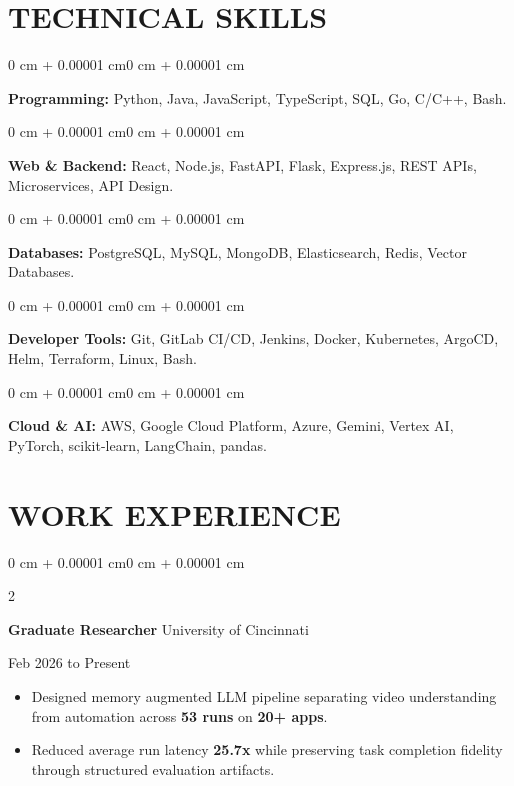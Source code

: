 \documentclass[10pt, letterpaper]{article}
\newenvironment{highlights}{
    \begin{itemize}[
        topsep=0.10 cm,
        parsep=0.06 cm,
        partopsep=0pt,
        itemsep=0.06 cm,
        leftmargin=12pt
    ]
}{
    \end{itemize}
}
\newenvironment{onecolentry}{
    \begin{adjustwidth}{0 cm + 0.00001 cm}{0 cm + 0.00001 cm}
}{
    \end{adjustwidth}
}
\newenvironment{twocolentry}[2][]{
    \onecolentry
    \def\secondColumn{#2}
    \setcolumnwidth{\fill, 4.5 cm}
    \begin{paracol}{2}
}{
    \switchcolumn \raggedleft \secondColumn
    \end{paracol}
    \endonecolentry
}
\begin{document}
\section{TECHNICAL SKILLS}
\begin{onecolentry}
\textbf{Programming:} Python, Java, JavaScript, TypeScript, SQL, Go, C/C++, Bash.
\end{onecolentry}
\vspace{0.06 cm}
\begin{onecolentry}
\textbf{Web \& Backend:} React, Node.js, FastAPI, Flask, Express.js, REST APIs, Microservices, API Design.
\end{onecolentry}
\vspace{0.06 cm}
\begin{onecolentry}
\textbf{Databases:} PostgreSQL, MySQL, MongoDB, Elasticsearch, Redis, Vector Databases.
\end{onecolentry}
\vspace{0.06 cm}
\begin{onecolentry}
\textbf{Developer Tools:} Git, GitLab CI/CD, Jenkins, Docker, Kubernetes, ArgoCD, Helm, Terraform, Linux, Bash.
\end{onecolentry}
\vspace{0.06 cm}
\begin{onecolentry}
\textbf{Cloud \& AI:} AWS, Google Cloud Platform, Azure, Gemini, Vertex AI, PyTorch, scikit-learn, LangChain, pandas.
\end{onecolentry}

\section{WORK EXPERIENCE}
\begin{twocolentry}{Feb 2026 to Present}
\textbf{Graduate Researcher} \textbar{} University of Cincinnati
\end{twocolentry}
\begin{highlights}
  \item Designed memory augmented LLM pipeline separating video understanding from automation across \textbf{53 runs} on \textbf{20+ apps}.
  \item Reduced average run latency \textbf{25.7x} while preserving task completion fidelity through structured evaluation artifacts.
\end{highlights}

\vspace{0.15 cm}
\end{document}
